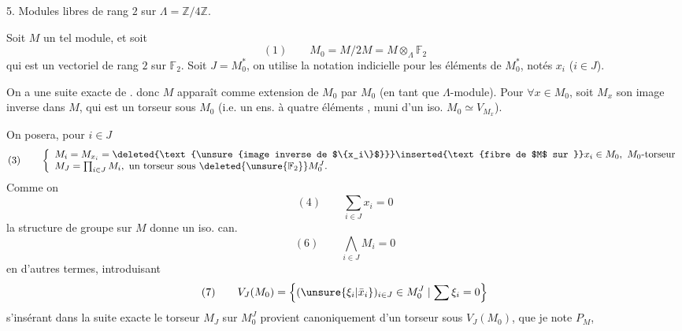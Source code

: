 5. Modules libres de rang $2$ sur $\Lambda=\mathbb{Z}/4\mathbb{Z}$.

Soit $M$ un tel module, et soit
\[
(1)\qquad M_0=M/2M=M\otimes_\Lambda\mathbb{F}_2
\]
qui est un vectoriel de rang $2$ sur $\mathbb{F}_2$. Soit $J=M_0^*$, on utilise la notation indicielle pour les éléments de $M_0^*$, notés $x_i$ ($i\in J$). 

On a une suite exacte de .
donc $M$ apparaît comme extension de $M_0$ par $M_0$ (en tant que $\Lambda$-module). Pour $\forall x\in M_0$, soit $M_x$ son image inverse dans $M$, qui est un torseur sous $M_0$ (i.e. un ens. à quatre éléments , muni d'un iso. $M_0\simeq V_{M_x}$).

On posera, pour $i\in J$
\[
(3)\qquad
\left\{\begin{array}{l}
M_i=M_{x_i}=\deleted{\text{\unsure{image inverse de $\{x_i\}$}}}
\inserted{\text{fibre de $M$ sur }}x_i\in M_0,\ M_0\text{-torseur}\\
M_J=\prod_{i\in J}M_i,\ \text{un torseur sous }\deleted{\unsure{\mathbb{F}_2}}M_0^J.
\end{array}\right.
\]
Comme on
\[
(4)\qquad\sum_{i\in J}x_i=0
\]
la structure de groupe sur $M$ donne un iso. can.
\[
(6)\qquad\bigwedge_{i\in J}M_i=0
\]
en d'autres termes, introduisant
\[
(7)\qquad V_J(M_0)=\left\{(\unsure{\xi_i|\bar{x}_i})_{i\in J}\in M_0^J\mid\sum\xi_i=0\right\}
\]
s'insérant dans la suite exacte
le torseur $M_J$ sur $M_0^J$ provient canoniquement d'un torseur sous $V_J(M_0)$, que je note $P_M$,
